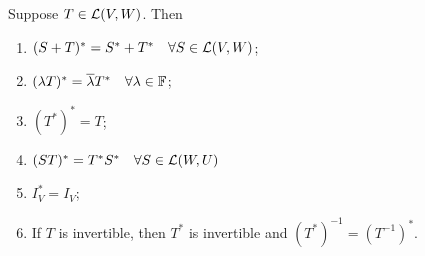 \begin{thm} 
  \label{thm: properties of the adjoint}
  Suppose $T \in {\mathcal{L}(V,W)}$. Then
  \begin{enumerate}[label=\textbf{(\alph*)}]
    \item $(S+T)^* = S^*+T^* \quad \forall S \in {\mathcal{L}(V,W)}$;
    \item $(\lambda T)^* = \overline \lambda T^* \quad \forall \lambda \in \mathbb{F}$;
    \item $(T^*)^* = T$;
    \item $(ST)^* = T^* S^* \quad \forall S \in \mathcal{L} (W,U)$ 
    \item $I^*_V = I_V$;
    \item If $T$ is invertible, then $T^*$ is invertible and $(T^*)^{-1} = (T^{-1})^*$.
  \end{enumerate}
\end{thm}
